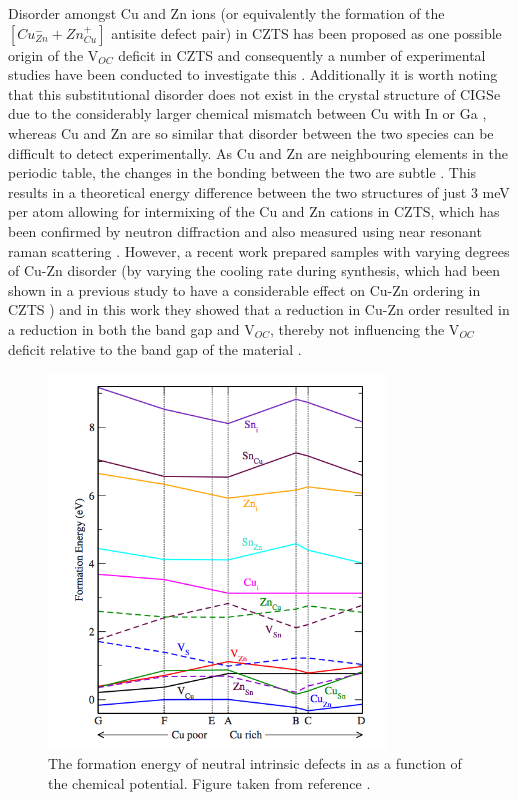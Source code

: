 Disorder amongst Cu and Zn ions (or equivalently the formation of the $[Cu_{Zn}^{-} + Zn_{Cu}^{+}]$ antisite defect pair) in CZTS has been proposed as one possible origin of the V$_{OC}$ deficit in CZTS and consequently a number of experimental studies have been conducted to investigate this \cite{Scragg, pot_fluc_4, neutron, Schorr}. Additionally it is worth noting that this substitutional disorder does not exist in the crystal structure of CIGSe due to the considerably larger chemical mismatch between Cu with In or Ga \cite{culprit}, whereas Cu and Zn are so similar that disorder between the two species can be difficult to detect experimentally. 
As Cu and Zn are neighbouring elements in the periodic table, the changes in the bonding between the two are subtle \cite{pot_fluc}. This results in a theoretical energy difference between the two structures of just 3 meV per atom \cite{Chen2009} allowing for intermixing of the Cu and Zn cations in CZTS, which has been confirmed by neutron diffraction \cite{pot_fluc_4, neutron} and also measured using near resonant raman scattering \cite{Scragg}. However, a recent work prepared samples with varying degrees of Cu-Zn disorder (by varying the cooling rate during synthesis, which had been shown in a previous study to have a considerable effect on Cu-Zn ordering in CZTS \cite{Scragg}) and in this work they showed that a reduction in Cu-Zn order resulted in a reduction in both the band gap and V$_{OC}$, thereby not influencing the V$_{OC}$ deficit relative to the band gap of the material \cite{culprit}.

\begin{figure}[h!]
  \centering
    \includegraphics[width=0.8\textwidth]{figures/Chen_pt_formE.png}
    \caption{The formation energy of neutral intrinsic defects in \CZTS as a function of the chemical potential. Figure taken from reference .}
  \label{Chen_pt1}
\end{figure}

